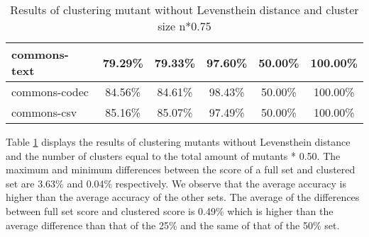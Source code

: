 \documentclass[../../main]{subfiles}
\begin{document}
\begin{table}[htb]
\begin{tabular}{|l|c|c|c|c|c|}
commons-text                  & 79.29\%                                                                                 & 79.33\%                                                                                     & 97.60\%                                                                              & 50.00\%                                                                               & 100.00\%                                                                             \\ \hline
commons-codec                 & 84.56\%                                                                                 & 84.61\%                                                                                     & 98.43\%                                                                              & 50.00\%                                                                               & 100.00\%                                                                             \\ \hline
commons-csv                   & 85.16\%                                                                                 & 85.07\%                                                                                     & 97.49\%                                                                              & 50.00\%                                                                               & 100.00\%                                                                             \\ \hline
\end{tabular}
\caption{\label{tab:clustering_no_distance_75}Results of clustering mutant without Levensthein distance and cluster size n*0.75}
\end{table}
\FloatBarrier

Table \ref{tab:clustering_no_distance_75} displays the results of clustering mutants without Levensthein distance and the number of clusters equal to the total amount of mutants * 0.50.
The maximum and minimum differences between the score of a full set and clustered set are 3.63\% and 0.04\% respectively.
We observe that the average accuracy is higher than the average accuracy of the other sets.
The average of the differences between full set score and clustered score is  0.49\% which is higher than the average difference than that of the 25\% and the same of that of the 50\% set.
\end{document}
